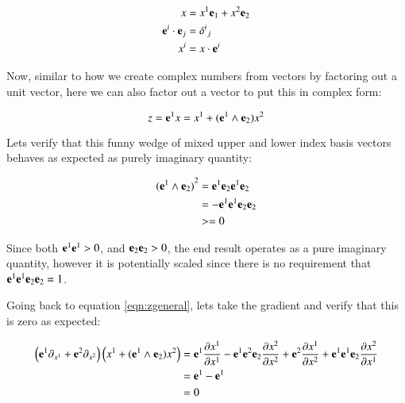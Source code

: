 \documentclass{article}
\newcommand{\PD}[2]{ \frac{\partial{#1}}{\partial {#2}} }
\begin{document}
\begin{align*}
x &= x^1 \mathbf{e}_1 + x^2 \mathbf{e}_2 \\
\mathbf{e}^i \cdot \mathbf{e}_j &= {\delta^i}_{j} \\
x^i &= x \cdot \mathbf{e}^i
\end{align*}

Now, similar to how we create complex numbers from vectors by factoring out a unit vector, here we can also factor out a vector to put this in complex form:

\begin{equation}\label{eqn:zgeneral}
z = \mathbf{e}^1 x = x^1 + (\mathbf{e}^1 \wedge \mathbf{e}_2) x^2
\end{equation}

Lets verify that this funny wedge of mixed upper and lower index basis vectors behaves as expected as purely imaginary
quantity:

\begin{align*}
{(\mathbf{e}^1 \wedge \mathbf{e}_2)}^2
&= \mathbf{e}^1 \mathbf{e}_2 \mathbf{e}^1 \mathbf{e}_2 \\
&= - \mathbf{e}^1 \mathbf{e}^1 \mathbf{e}_2 \mathbf{e}_2 \\
&>= 0
\end{align*}

Since both $\mathbf{e}^1 \mathbf{e}^1 > 0$, and $\mathbf{e}_2 \mathbf{e}_2 > 0$, the end result operates as a pure imaginary quantity, however it is potentially
scaled since there is no requirement that $\mathbf{e}^1 \mathbf{e}^1 \mathbf{e}_2 \mathbf{e}_2 = 1$.

Going back to equation \ref{eqn:zgeneral}, lets take the gradient and verify that this is zero as expected:

\begin{align*}
\left(\Be^1 \partial_{x^1} + \Be^2 \partial_{x^2}\right) \left(x^1 + (\Be^1 \wedge \Be_2) x^2\right)
&= \Be^1 \PD{x^1}{x^1} -\Be^1 \Be^2 \Be_2 \PD{x^2}{x^2} + \Be^2\PD{x^1}{x^2} + \Be^1 \Be^1 \Be_2 \PD{x^2}{x^1} \\
&= \Be^1 - \Be^1 \\
&= 0
\end{align*}
\end{document}
